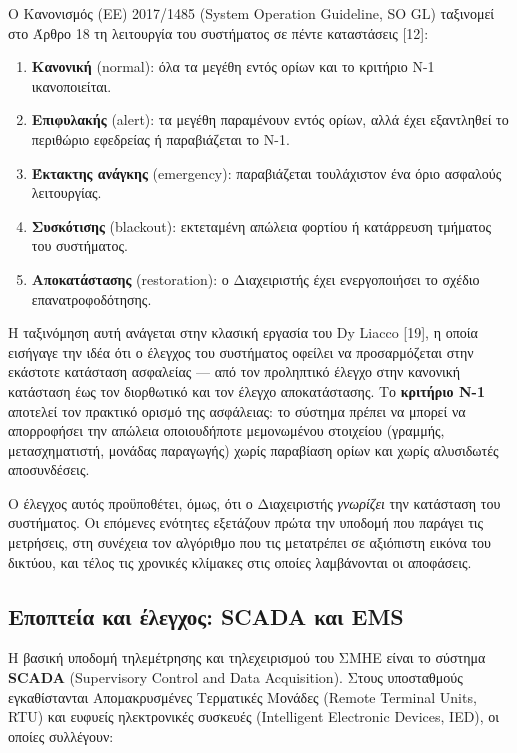 Ο Κανονισμός (ΕΕ) 2017/1485 (System Operation Guideline, SO GL) ταξινομεί στο Άρθρο 18 τη
λειτουργία του συστήματος σε πέντε καταστάσεις [12]:

\begin{enumerate}
\item \textbf{Κανονική} (normal): όλα τα μεγέθη εντός ορίων και το κριτήριο N-1 ικανοποιείται.
\item \textbf{Επιφυλακής} (alert): τα μεγέθη παραμένουν εντός ορίων, αλλά έχει εξαντληθεί το
      περιθώριο εφεδρείας ή παραβιάζεται το N-1.
\item \textbf{Έκτακτης ανάγκης} (emergency): παραβιάζεται τουλάχιστον ένα όριο ασφαλούς λειτουργίας.
\item \textbf{Συσκότισης} (blackout): εκτεταμένη απώλεια φορτίου ή κατάρρευση τμήματος του συστήματος.
\item \textbf{Αποκατάστασης} (restoration): ο Διαχειριστής έχει ενεργοποιήσει το σχέδιο επανατροφοδότησης.
\end{enumerate}

Η ταξινόμηση αυτή ανάγεται στην κλασική εργασία του Dy Liacco [19], η οποία εισήγαγε την ιδέα ότι
ο έλεγχος του συστήματος οφείλει να προσαρμόζεται στην εκάστοτε κατάσταση ασφαλείας — από τον
προληπτικό έλεγχο στην κανονική κατάσταση έως τον διορθωτικό και τον έλεγχο αποκατάστασης.
Το \textbf{κριτήριο N-1} αποτελεί τον πρακτικό ορισμό της ασφάλειας: το σύστημα πρέπει να μπορεί να
απορροφήσει την απώλεια οποιουδήποτε μεμονωμένου στοιχείου (γραμμής, μετασχηματιστή, μονάδας
παραγωγής) χωρίς παραβίαση ορίων και χωρίς αλυσιδωτές αποσυνδέσεις.

Ο έλεγχος αυτός προϋποθέτει, όμως, ότι ο Διαχειριστής \emph{γνωρίζει} την κατάσταση του συστήματος.
Οι επόμενες ενότητες εξετάζουν πρώτα την υποδομή που παράγει τις μετρήσεις, στη συνέχεια τον
αλγόριθμο που τις μετατρέπει σε αξιόπιστη εικόνα του δικτύου, και τέλος τις χρονικές κλίμακες στις
οποίες λαμβάνονται οι αποφάσεις.

\subsection{Εποπτεία και έλεγχος: SCADA και EMS}

Η βασική υποδομή τηλεμέτρησης και τηλεχειρισμού του ΣΜΗΕ είναι το σύστημα \textbf{SCADA}
(Supervisory Control and Data Acquisition). Στους υποσταθμούς εγκαθίστανται Απομακρυσμένες
Τερματικές Μονάδες (Remote Terminal Units, RTU) και ευφυείς ηλεκτρονικές συσκευές (Intelligent
Electronic Devices, IED), οι οποίες συλλέγουν:

